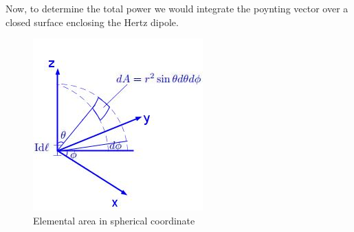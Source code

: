 Now, to determine the total power we would integrate the poynting vector over a closed surface enclosing the Hertz dipole.
\begin{figure}[h]
\centering
\includegraphics[width=.8\linewidth]{./graphics/diagram1}
\caption{Elemental area in spherical coordinate}
\label{figure12}
\end{figure}

